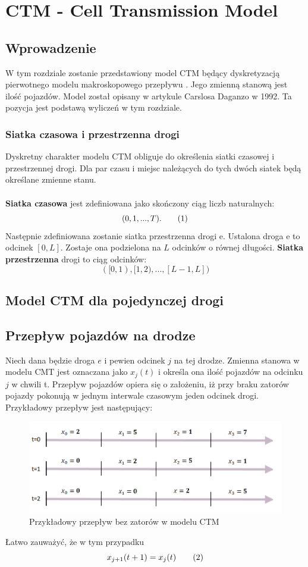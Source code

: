 \documentclass[12pt]{book}
\theoremstyle{plain}
\newcommand\addtag{\refstepcounter{equation}
\renewcommand{\labelenumii}{\theenumii}
\renewcommand{\theenumii}{\theenumi.\arabic{enumii}.}
\tag{\theequation}}
\begin{document}
\section{CTM - Cell Transmission Model} \label{sec:CTM}
\subsection{Wprowadzenie}
W tym rozdziale zostanie przedstawiony model CTM będący dyskretyzacją pierwotnego modelu makroskopowego przepływu \cite{lwr}. Jego zmienną stanową jest ilość pojazdów. Model został opisany w artykule Carslosa Daganzo \cite{CTM} w 1992. Ta pozycja jest podstawą wyliczeń w tym rozdziale.
\subsubsection*{Siatka czasowa i przestrzenna drogi}
Dyskretny charakter modelu CTM obliguje do określenia siatki czasowej i przestrzennej drogi. Dla par czasu i miejsc należących do tych dwóch siatek będą określane zmienne stanu. \\ \\ \textbf{Siatka czasowa} jest zdefiniowana jako skończony ciąg liczb naturalnych:
\[(0,1,...,T). \addtag \]
Następnie zdefiniowana zostanie siatka przestrzenna drogi e. Ustalona droga e to odcinek $[0,L]$. Zostaje ona podzielona na $L$ odcinków o równej długości. \textbf{Siatka przestrzenna} drogi to ciąg odcinków:
\[([0,1),[1,2),...,[L-1,L] )\]

\subsection{Model CTM dla pojedynczej drogi}
\subsection*{Przepływ pojazdów na drodze}
Niech dana będzie droga $e$ i pewien odcinek $j$ na tej drodze. Zmienna stanowa w modelu CMT jest oznaczana jako $x_j(t)$ i określa ona ilość pojazdów na odcinku $j$ w chwili t.
Przepływ pojazdów opiera się o założeniu, iż przy braku zatorów pojazdy pokonują w jednym interwale czasowym jeden odcinek drogi. Przykładowy przepływ jest następujący:
\begin{figure}[H]
	\centering
	\includegraphics[width=14cm]{images/CTM_flow_example}
	\caption{Przykładowy przepływ bez zatorów w modelu CTM}
	\label{fig:CTM_flow_example}
\end{figure} \noindent
Łatwo zauważyć, że w tym przypadku
\[ x_{j+1}(t+1)=x_j(t) \addtag \]
\end{document}
